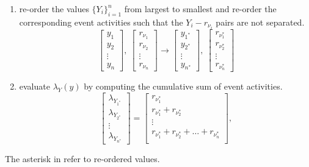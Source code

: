 \begin{enumerate}
\item re-order the values $\{Y_i\}_{i=1}^n$ from largest to
smallest and re-order the corresponding event activities such that
the $Y_i-r_{\nu _i}$ pairs are not separated.
\begin{equation}
\label{eq:eva-vectors1} \left[\begin{matrix}
  y_{1}\\ y_{2} \\ \vdots\\ y_{n}
\end{matrix}\right],
\ \left[\begin{matrix}
 r_{\nu_1} \\ r_{\nu_2} \\ \vdots\\ r_{\nu_n}
\end{matrix}\right]
\to \left[\begin{matrix}
  y_{1^*}\\ y_{2^*} \\ \vdots\\ y_{n^*}
\end{matrix}\right],
\ \left[\begin{matrix}
 r_{\nu_1^*} \\ r_{\nu_2^*} \\ \vdots\\ r_{\nu_n^*}
\end{matrix}\right]
\end{equation}
\item evaluate $\lambda_Y(y)$ by computing the cumulative sum of
event activities.
\begin{equation}
\label{eq:eva-vectors2} \left[\begin{matrix}
 \lambda_{Y_{1^*}}\\ \lambda_{Y_{2^*}} \\ \vdots\\ \lambda_{Y_{n^*}}
\end{matrix}\right] =
\left[\begin{matrix}
  r_{\nu_1^*}\\
   r_{\nu_1^*}+ r_{\nu_2^*} \\
   \vdots\\
   r_{\nu_1^*}+ r_{\nu_2^*} + \ldots + r_{\nu_n^*}\\
\end{matrix}\right],
\end{equation}
\end{enumerate}
The asterisk in  refer
to re-ordered values.


